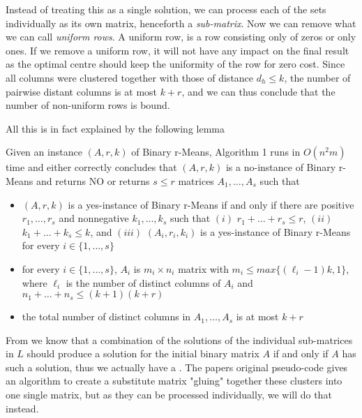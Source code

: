 \documentclass[a4paper]{article}
\begin{document}
Instead of treating this as a single solution, we can process each of the sets individually as its own matrix, henceforth
a \textit{sub-matrix}. Now we can remove what we can call \textit{uniform rows}. A uniform row, is a row consisting
only of zeros or only ones. If we remove a uniform row, it will not have any impact on the final result as the optimal centre
should keep the uniformity of the row for zero cost. Since all columns were clustered together with those of distance $d_h \leq k$,
the number of pairwise distant columns is at most $k+r$, and we can thus conclude that the number of non-uniform rows is bound.

All this is in fact explained by the following lemma
\begin{theoremlemma}{\cite[Lemma 5]{fomin_golovach_panolan_2020}}
    Given an instance $(A,r,k)$ of Binary r-Means, Algorithm 1 runs in $O(n^2m)$ time
    and either correctly concludes that $(A,r,k)$ is a no-instance of Binary r-Means and
    returns NO or returns $s \leq r$ matrices $A_1, \dots, A_s$ such that
    \begin{itemize}
        \item $(A,r,k)$ is a yes-instance of Binary r-Means if and only if there are positive
              $r_1,\dots,r_s$ and nonnegative $k_1,\dots,k_s$ such that $(i)$ $r_1 + \dots + r_s \leq r$,
              $(ii)$ $k_1 + \dots + k_s \leq k$, and $(iii)$ $(A_i,r_i,k_i)$ is a yes-instance of Binary
              r-Means for every $i\in\{1,\dots,s\}$
        \item for every $i\in\{1,\dots,s\}$, $A_i$ is $m_i \times n_i$ matrix with
              $m_i \leq max\{(\ell_i - 1)k, 1\}$, where $\ell_i$ is the number of distinct columns
              of $A_i$ and $n_1 + \dots + n_s \leq (k+1)(k+r)$
        \item the total number of distinct columns in $A_1,\dots,A_s$ is at most $k+r$
    \end{itemize}
    \label{lem:5}
\end{theoremlemma}



From  we know that a combination of the solutions of the
individual sub-matrices in $L$ should produce a solution for the initial binary matrix $A$ if and only if $A$ has such a solution, 
thus we actually have a .
The papers original pseudo-code \cite{fomin_golovach_panolan_2020} gives an algorithm to create a substitute matrix "gluing" together these clusters into
one single matrix, but as they can be processed individually, we will do that instead.
\end{document}
